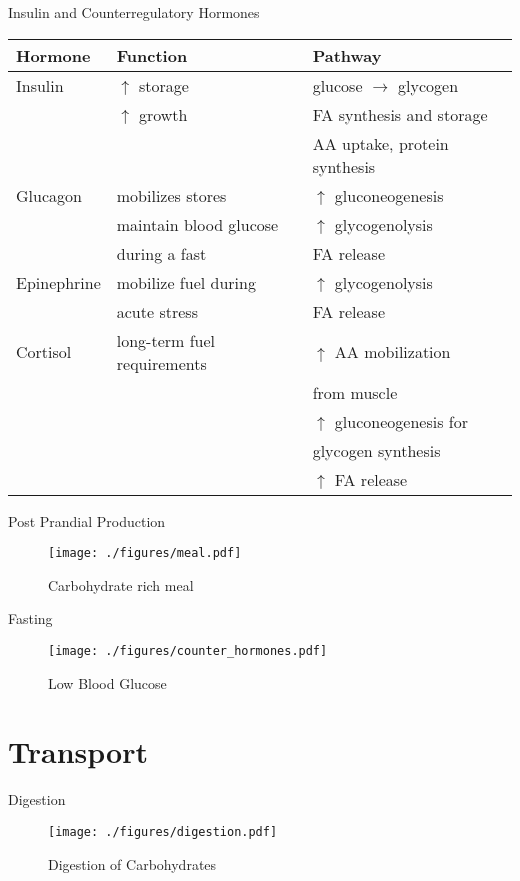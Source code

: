 \documentclass[presentation, smaller]{beamer}
\begin{document}
\begin{frame}[label={sec:org2d3913a}]{Insulin and Counterregulatory Hormones}
\begin{center}
\begin{tabular}{lll}
Hormone & Function & Pathway\\
\hline
Insulin & \(\uparrow\) storage & glucose \(\to\) glycogen\\
 & \(\uparrow\) growth & FA synthesis and storage\\
 &  & AA uptake, protein synthesis\\
\hline
Glucagon & mobilizes stores & \(\uparrow\) gluconeogenesis\\
 & maintain blood glucose & \(\uparrow\) glycogenolysis\\
 & during a fast & FA release\\
\hline
Epinephrine & mobilize fuel during & \(\uparrow\) glycogenolysis\\
 & acute stress & FA release\\
\hline
Cortisol & long-term fuel requirements & \(\uparrow\) AA mobilization\\
 &  & from muscle\\
 &  & \(\uparrow\) gluconeogenesis for\\
 &  & glycogen synthesis\\
 &  & \(\uparrow\) FA release\\
\end{tabular}
\end{center}
\end{frame}

\begin{frame}[label={sec:org271c573}]{Post Prandial Production}
\begin{figure}[htbp]
\centering
\texttt{[image: ./figures/meal.pdf]}
\caption{\label{fig:orgb6667bb}
Carbohydrate rich meal}
\end{figure}
\end{frame}

\begin{frame}[label={sec:org76f735f}]{Fasting}
\begin{figure}[htbp]
\centering
\texttt{[image: ./figures/counter\_hormones.pdf]}
\caption{\label{fig:orgf8b9b2b}
Low Blood Glucose}
\end{figure}
\end{frame}

\section{Transport}
\label{sec:org248c6b4}
\begin{frame}[label={sec:orgb6358f5}]{Digestion}
\begin{figure}[htbp]
\centering
\texttt{[image: ./figures/digestion.pdf]}
\caption{\label{fig:org8e2a0a7}
Digestion of Carbohydrates}
\end{figure}
\end{frame}
\end{document}
